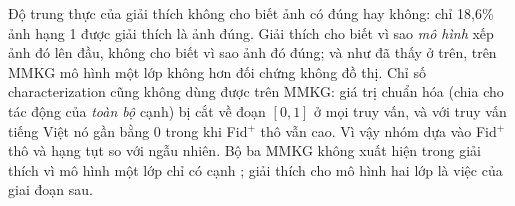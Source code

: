 Độ trung thực của giải thích không cho biết ảnh có đúng hay không: chỉ 18,6\% ảnh hạng 1 được giải thích là ảnh đúng. Giải thích cho biết vì sao \emph{mô hình} xếp ảnh đó lên đầu, không cho biết vì sao ảnh đó đúng; và như đã thấy ở trên, trên MMKG mô hình một lớp không hơn đối chứng không đồ thị. Chỉ số characterization cũng không dùng được trên MMKG: giá trị chuẩn hóa (chia cho tác động của \emph{toàn bộ} cạnh) bị cắt về đoạn $[0, 1]$ ở mọi truy vấn, và với truy vấn tiếng Việt nó gần bằng 0 trong khi Fid$^+$ thô vẫn cao. Vì vậy nhóm dựa vào Fid$^+$ thô và hạng tụt so với ngẫu nhiên. Bộ ba MMKG không xuất hiện trong giải thích vì mô hình một lớp chỉ có cạnh ; giải thích cho mô hình hai lớp là việc của giai đoạn sau.
